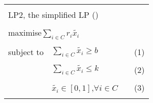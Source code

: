 \renewcommand{\arraystretch}{0.7}
\begin{tabularx}{\linewidth}{|lllr|}
    \hline
    & & &\tabularnewline
    \multicolumn{4}{|X|}{LP2, the simplified LP (\cite{bandyapadhyay_constant_2019})} \tabularnewline
    \hline
    & & &\tabularnewline
    \multicolumn{4}{|X|}{maximise\hphantom{.....}$\displaystyle \sum_{i\in C} r_{i}\tilde{x_i}$} \tabularnewline
    & & &\tabularnewline
    subject to & $\displaystyle \sum_{i\in C} \tilde{x_i}\geq b$ & &(1)\tabularnewline
    & & &\tabularnewline
    & $\displaystyle \sum_{i\in C} \tilde{x_i}\leq k$ & &(2)\tabularnewline
    & & &\tabularnewline
    \hphantom{.....}& $\tilde{x_i}\in [0,1]$,\hphantom{....}$\forall i\in C$ & &(3)\tabularnewline
    & & &\tabularnewline
    \hline
\end{tabularx}%
\renewcommand{\arraystretch}{1.0}
